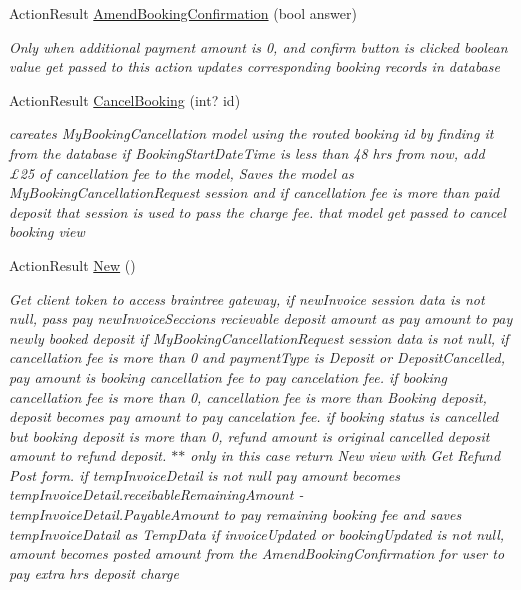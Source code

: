 \begin{DoxyCompactItemize}
Action\+Result \hyperlink{class_alfa_accounting_1_1_controllers_1_1_booking_view_models_controller_a6e5358b2fd882c060e26353c85658d87}{Amend\+Booking\+Confirmation} (bool answer)
\begin{DoxyCompactList}\small\item\em Only when additional payment amount is 0, and confirm button is clicked boolean value get passed to this action updates corresponding booking records in database \end{DoxyCompactList}\item 
Action\+Result \hyperlink{class_alfa_accounting_1_1_controllers_1_1_booking_view_models_controller_a34296cd23c09ae737da8519afeb608ab}{Cancel\+Booking} (int? id)
\begin{DoxyCompactList}\small\item\em careates My\+Booking\+Cancellation model using the routed booking id by finding it from the database if Booking\+Start\+Date\+Time is less than 48 hrs from now, add £25 of cancellation fee to the model, Saves the model as My\+Booking\+Cancellation\+Request session and if cancellation fee is more than paid deposit that session is used to pass the charge fee. that model get passed to cancel booking view \end{DoxyCompactList}\item 
Action\+Result \hyperlink{class_alfa_accounting_1_1_controllers_1_1_booking_view_models_controller_ae5344a979e68c8b3714902ad3bc2f98c}{New} ()
\begin{DoxyCompactList}\small\item\em Get client token to access braintree gateway, if new\+Invoice session data is not null, pass pay new\+Invoice\+Seccion\textquotesingle{}s recievable deposit amount as pay amount to pay newly booked deposit if My\+Booking\+Cancellation\+Request session data is not null, if cancellation fee is more than 0 and payment\+Type is Deposit or Deposit\+Cancelled, pay amount is booking cancellation fee to pay cancelation fee. if booking cancellation fee is more than 0, cancellation fee is more than Booking deposit, deposit becomes pay amount to pay cancelation fee. if booking status is cancelled but booking deposit is more than 0, refund amount is original cancelled deposit amount to refund deposit. $\ast$$\ast$ only in this case return New view with Get Refund Post form. if temp\+Invoice\+Detail is not null pay amount becomes temp\+Invoice\+Detail.\+receibable\+Remaining\+Amount -\/ temp\+Invoice\+Detail.\+Payable\+Amount to pay remaining booking fee and saves temp\+Invoice\+Datail as Temp\+Data if invoice\+Updated or booking\+Updated is not null, amount becomes posted amount from the Amend\+Booking\+Confirmation for user to pay extra hrs deposit charge \end{DoxyCompactList}\item 

\end{DoxyCompactItemize}
